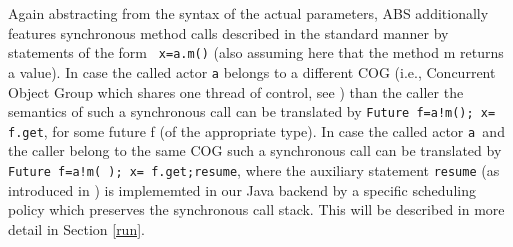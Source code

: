 Again abstracting from the syntax of the actual parameters,
ABS additionally features synchronous method calls described in the standard manner
by statements of the form \lstinline| x=a.m()| (also assuming here that the method m returns a value). In case the called actor \lstinline|a| belongs to a different 
COG (i.e., Concurrent Object Group which shares one thread of control, see \cite{abs})
than the caller the semantics of such a synchronous call can be translated
by \lstinline|Future f=a!m(); x= f.get|, for some future f (of the appropriate type).
In case the called actor \lstinline|a |and the caller belong to the same COG such a synchronous call can be translated by \lstinline|Future f=a!m( ); x= f.get;resume|,
where the auxiliary statement \lstinline|resume| (as introduced in \cite{resume})
is implememted in our Java backend by a specific scheduling policy which preserves the synchronous call stack.
This will be described in more detail in Section \ref{run}.




